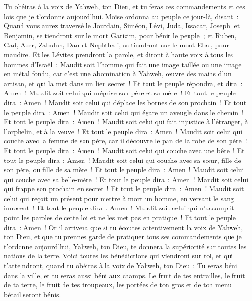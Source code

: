\begin{multicols}{2}
Tu obéiras à la voix de Yahweh, ton Dieu, et tu feras ces commandements et ces lois que je t'ordonne aujourd'hui.
Moïse ordonna au peuple ce jour-là, disant~:
Quand vous aurez traversé le Jourdain, Siméon, Lévi, Juda, Issacar, Joseph, et Benjamin, se tiendront sur le mont Garizim, pour bénir le peuple~;
et Ruben, Gad, Aser, Zabulon, Dan et Nephthali, se tiendront sur le mont Ebal, pour maudire.
Et les Lévites prendront la parole, et diront à haute voix à tous les hommes d'Israël~:
Maudit soit l'homme qui fait une image taillée ou une image en métal fondu, car c'est une abomination à Yahweh, œuvre des mains d'un artisan, et qui la met dans un lieu secret~! Et tout le peuple répondra, et dira~: Amen~!
Maudit soit celui qui méprise son père et sa mère~! Et tout le peuple dira~: Amen~!
Maudit soit celui qui déplace les bornes de son prochain~! Et tout le peuple dira~: Amen~!
Maudit soit celui qui égare un aveugle dans le chemin~! Et tout le peuple dira~: Amen~!
Maudit soit celui qui fait injustice à l'étranger, à l'orphelin, et à la veuve~! Et tout le peuple dira~: Amen~!
Maudit soit celui qui couche avec la femme de son père, car il découvre le pan de la robe de son père~! Et tout le peuple dira~: Amen~!
Maudit soit celui qui couche avec une bête~! Et tout le peuple dira~: Amen~!
Maudit soit celui qui couche avec sa sœur, fille de son père, ou fille de sa mère~! Et tout le peuple dira~: Amen~!
Maudit soit celui qui couche avec sa belle-mère~! Et tout le peuple dira~: Amen~!
Maudit soit celui qui frappe son prochain en secret~! Et tout le peuple dira~: Amen~!
Maudit soit celui qui reçoit un présent pour mettre à mort un homme, en versant le sang innocent~! Et tout le peuple dira~: Amen~!
Maudit soit celui qui n'accomplit point les paroles de cette loi et ne les met pas en pratique~! Et tout le peuple dira~: Amen~!
\VerseOne{}Or il arrivera que si tu écoutes attentivement la voix de Yahweh, ton Dieu, et que tu prennes garde de pratiquer tous ses commandements que je t'ordonne aujourd'hui, Yahweh, ton Dieu, te donnera la supériorité sur toutes les nations de la terre.
Voici toutes les bénédictions qui viendront sur toi, et qui t'atteindront, quand tu obéiras à la voix de Yahweh, ton Dieu~:
Tu seras béni dans la ville, et tu seras aussi béni aux champs.
Le fruit de tes entrailles, le fruit de ta terre, le fruit de tes troupeaux, les portées de ton gros et de ton menu bétail seront bénis.

\end{multicols}
